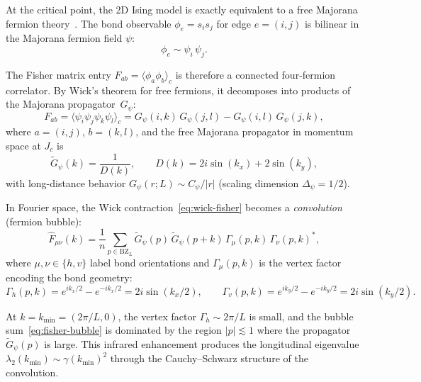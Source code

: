 \documentclass[11pt]{article}
\theoremstyle{definition}
\theoremstyle{remark}
\newcommand{\Fish}{F}
\newcommand{\Jc}{J_c}
\newcommand{\BZ}{\mathrm{BZ}}
\begin{document}
At the critical point, the 2D Ising model is exactly equivalent to a
free Majorana fermion theory~\cite{Kaufman1949,SchultzMattisLieb1964}.
The bond observable $\phi_e = s_i s_j$ for edge $e = (i,j)$ is
bilinear in the Majorana fermion field $\psi$:
\begin{equation}
  \phi_e \sim \psi_i\,\psi_j.
  \label{eq:bond-fermion}
\end{equation}

The Fisher matrix entry $\Fish_{ab} = \langle\phi_a\phi_b\rangle_c$ is
therefore a connected four-fermion correlator. By Wick's theorem for
free fermions, it decomposes into products of the Majorana
propagator~$G_\psi$:
\begin{equation}
  \Fish_{ab} = \langle\psi_{i}\psi_{j}\psi_{k}\psi_{l}\rangle_c
    = G_\psi(i,k)\,G_\psi(j,l) - G_\psi(i,l)\,G_\psi(j,k),
  \label{eq:wick-fisher}
\end{equation}
where $a = (i,j)$, $b = (k,l)$, and the free Majorana propagator in
momentum space at $\Jc$ is
\begin{equation}
  \tilde{G}_\psi(k) = \frac{1}{D(k)}, \qquad
  D(k) = 2i\sin(k_x) + 2\sin(k_y),
  \label{eq:majorana-propagator}
\end{equation}
with long-distance behavior $G_\psi(r;L) \sim C_\psi/|r|$ (scaling
dimension $\Delta_\psi = 1/2$).

In Fourier space, the Wick contraction~\eqref{eq:wick-fisher} becomes
a \emph{convolution} (fermion bubble):
\begin{equation}
  \hat{\Fish}_{\mu\nu}(k) = \frac{1}{n}\sum_{p \in \BZ_L}
    \tilde{G}_\psi(p)\,\tilde{G}_\psi(p + k)\,
    \Gamma_\mu(p, k)\,\Gamma_\nu(p, k)^*,
  \label{eq:fisher-bubble}
\end{equation}
where $\mu, \nu \in \{h, v\}$ label bond orientations and
$\Gamma_\mu(p, k)$ is the vertex factor encoding the bond geometry:
\begin{equation}
  \Gamma_h(p, k) = e^{ik_x/2} - e^{-ik_x/2} = 2i\sin(k_x/2), \qquad
  \Gamma_v(p, k) = e^{ik_y/2} - e^{-ik_y/2} = 2i\sin(k_y/2).
  \label{eq:vertex-factors}
\end{equation}

At $k = k_{\min} = (2\pi/L, 0)$, the vertex factor $\Gamma_h \sim 2\pi/L$
is small, and the bubble sum~\eqref{eq:fisher-bubble} is dominated by
the region $|p| \lesssim 1$ where the propagator $\tilde{G}_\psi(p)$
is large. This infrared enhancement produces the longitudinal eigenvalue
$\lambda_2(k_{\min}) \sim \gamma(k_{\min})^2$ through the
Cauchy--Schwarz structure of the convolution.
\end{document}
